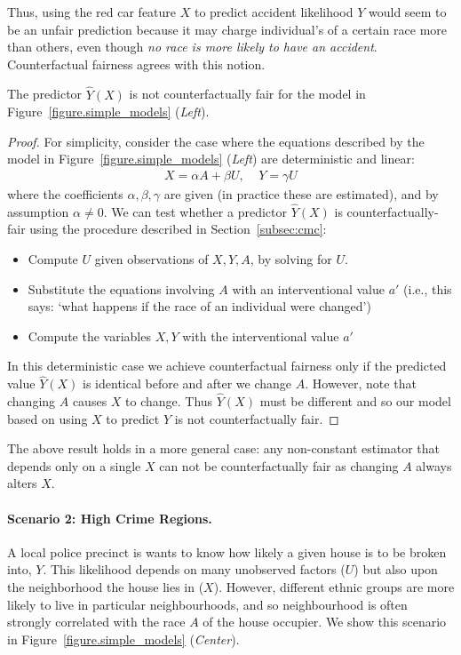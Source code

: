 Thus, using the red car feature $X$ to predict accident likelihood $Y$ would seem to be an unfair prediction because it may charge individual's of a certain race more than others, even though {\em no race is more likely to have an accident}. Counterfactual fairness agrees with this notion. 
%
\begin{lem}
The predictor $\hat{Y}(X)$ is not counterfactually fair for the model in Figure~\ref{figure.simple_models} (\emph{Left}).
\end{lem}
%
\begin{proof}
For simplicity, consider the case where the equations described by the model in Figure~\ref{figure.simple_models} (\emph{Left}) are deterministic and linear:
\begin{align}
X = \alpha A + \beta U, \;\;\;\; Y = \gamma U \nonumber
\end{align}
where the coefficients $\alpha,\beta,\gamma$ are given (in practice these are estimated), and by assumption $\alpha \neq 0$. We can test whether a predictor $\hat{Y}(X)$ is counterfactually-fair using the procedure described in Section~\ref{subsec:cmc}:
\begin{itemize}
\item Compute $U$ given observations of $X,Y,A$, by solving for $U$.
\item Substitute the equations involving $A$ with an interventional value $a'$ (i.e., this says: `what happens if the race of an individual were changed')
\item Compute the variables $X,Y$ with the interventional value $a'$
\end{itemize}
In this deterministic case we achieve counterfactual fairness only if the predicted value $\hat{Y}(X)$ is identical before and after we change $A$. However, note that changing $A$ causes $X$ to change. Thus $\hat{Y}(X)$ must be different and so our model based on using $X$ to predict $Y$ is not counterfactually fair.
\end{proof}
The above result holds in a more general case: any non-constant estimator that depends only on a single $X$ can not be counterfactually fair as changing $A$ always alters $X$.
%
%
\paragraph{Scenario 2: High Crime Regions.} 
A local police precinct is wants to know how likely a given house is to be broken into, $Y$. This likelihood depends on many unobserved factors
($U$) but also upon the neighborhood the house lies in ($X$). However, different ethnic groups are more likely to live in particular neighbourhoods, and so neighbourhood is often strongly correlated with the 
race $A$ of the house occupier. We show this scenario in Figure~\ref{figure.simple_models} (\emph{Center}).


